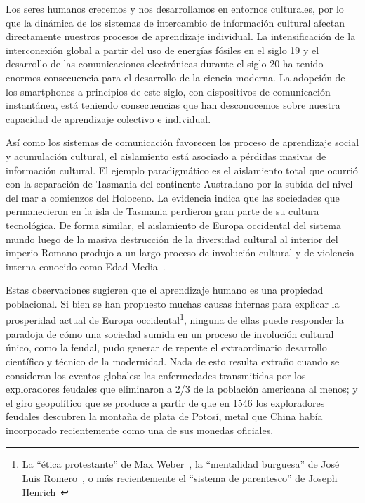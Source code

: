 \documentclass[a4paper,11pt]{book}
\theoremstyle{definition}
\begin{document}

Los seres humanos crecemos y nos desarrollamos en entornos culturales, por lo que la dinámica de los sistemas de intercambio de información cultural afectan directamente nuestros procesos de aprendizaje individual.
%
La intensificación de la interconexión global a partir del uso de energías fósiles en el siglo 19 y el desarrollo de las comunicaciones electrónicas durante el siglo 20 ha tenido enormes consecuencia para el desarrollo de la ciencia moderna.
%
La adopción de los smartphones a principios de este siglo, con dispositivos de comunicación instantánea, está teniendo consecuencias que han desconocemos sobre nuestra capacidad de aprendizaje colectivo e individual.


Así como los sistemas de comunicación favorecen los proceso de aprendizaje social y acumulación cultural, el aislamiento está asociado a pérdidas masivas de información cultural.
%
El ejemplo paradigmático es el aislamiento total que ocurrió con la separación de Tasmania del continente Australiano por la subida del nivel del mar a comienzos del Holoceno.
%
La evidencia indica que las sociedades que permanecieron en la isla de Tasmania perdieron gran parte de su cultura tecnológica.
%
De forma similar, el aislamiento de Europa occidental del sistema mundo luego de la masiva destrucción de la diversidad cultural al interior del imperio Romano produjo a un largo proceso de involución cultural y de violencia interna conocido como Edad Media~\cite{dussel2004}.


Estas observaciones sugieren que el aprendizaje humano es una propiedad poblacional.
%
Si bien se han propuesto muchas causas internas para explicar la prosperidad actual de Europa occidental\footnote{La ``ética protestante'' de Max Weber~\cite{weber1905-eticaProtestante}, la ``mentalidad burguesa'' de José Luis Romero~\cite{romero1967-revolucionBurguesa}, o más recientemente el ``sistema de parentesco'' de Joseph Henrich~\cite{henrich2020-weirdest}}, ninguna de ellas puede responder la paradoja de cómo una sociedad sumida en un proceso de involución cultural único, como la feudal, pudo generar de repente el extraordinario desarrollo científico y técnico de la modernidad.
%
Nada de esto resulta extraño cuando se consideran los eventos globales: las enfermedades transmitidas por los exploradores feudales que eliminaron a 2/3 de la población americana al menos; y el giro geopolítico que se produce a partir de que en 1546 los exploradores feudales descubren la montaña de plata de Potosí, metal que China había incorporado recientemente como una de sus monedas oficiales.
\end{document}
